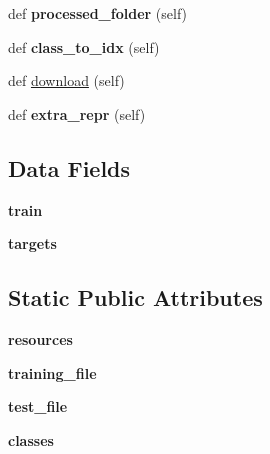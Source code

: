 \begin{DoxyCompactItemize}
\mbox{\label{classtorchvision_1_1datasets_1_1mnist_1_1MNIST_a038dfd3618498be039d69816c91505ae}} 
def {\bfseries processed\+\_\+folder} (self)
\item 
\mbox{\label{classtorchvision_1_1datasets_1_1mnist_1_1MNIST_a9a6f351d858b9e02a72b65805ddf9af2}} 
def {\bfseries class\+\_\+to\+\_\+idx} (self)
\item 
def \hyperlink{classtorchvision_1_1datasets_1_1mnist_1_1MNIST_aeb0f2b944361212497bd448ed09af5b6}{download} (self)
\item 
\mbox{\label{classtorchvision_1_1datasets_1_1mnist_1_1MNIST_a91571748cd2025c347c4549947d20dee}} 
def {\bfseries extra\+\_\+repr} (self)
\end{DoxyCompactItemize}
\subsection*{Data Fields}
\begin{DoxyCompactItemize}
\item 
\mbox{\label{classtorchvision_1_1datasets_1_1mnist_1_1MNIST_a546b79da9f17776fc69f362c7fb6ae86}} 
{\bfseries train}
\item 
\mbox{\label{classtorchvision_1_1datasets_1_1mnist_1_1MNIST_a397813cb10ed231868d24f5b423209eb}} 
{\bfseries targets}
\end{DoxyCompactItemize}
\subsection*{Static Public Attributes}
\begin{DoxyCompactItemize}
\item 
\mbox{\label{classtorchvision_1_1datasets_1_1mnist_1_1MNIST_a97f91251afb45ae4a2a998c949fc1e8b}} 
{\bfseries resources}
\item 
\mbox{\label{classtorchvision_1_1datasets_1_1mnist_1_1MNIST_a97703572b9f227a9cbe9fb332280ae28}} 
{\bfseries training\+\_\+file}
\item 
\mbox{\label{classtorchvision_1_1datasets_1_1mnist_1_1MNIST_a1f3ab0c36a638bf3d8724a39e13da001}} 
{\bfseries test\+\_\+file}
\item 
\mbox{\label{classtorchvision_1_1datasets_1_1mnist_1_1MNIST_a7dd71059602c3ba2784781e890e008b7}} 
{\bfseries classes}
\end{DoxyCompactItemize}


